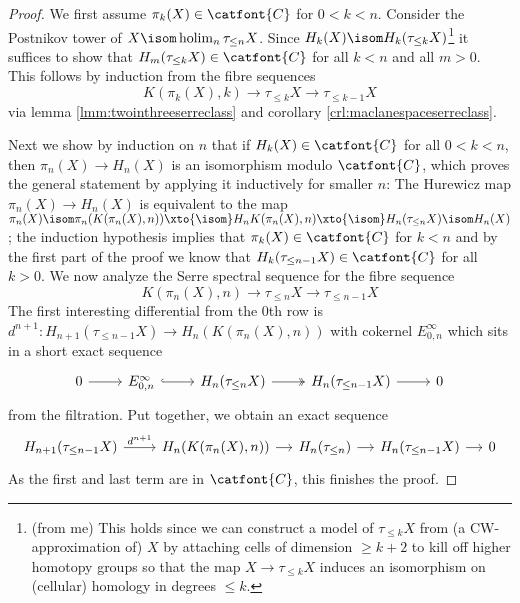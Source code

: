 \begin{proof}
	We first assume $\pi_k(X) \in \catfont{C}$ for $0 < k < n$.
	Consider the Postnikov tower of $X \isom \holim_n \tau_{\leq n} X$.
	Since $H_k(X) \isom H_k(\tau_{\leq k} X)$\footnote{(from me) This holds since we can construct a model of $\tau_{\leq k} X$ from (a CW-approximation of) $X$ by attaching cells of dimension $\geq k + 2$ to kill off higher homotopy groups so that the map $X \to \tau_{\leq k} X$ induces an isomorphism on (cellular) homology in degrees $\leq k$.} it suffices to show that $H_m(\tau_{\leq k} X) \in \catfont{C}$ for all $k < n$ and all $m > 0$.
	This follows by induction from the fibre sequences
	\begin{equation*}
		K(\pi_k(X), k) \to \tau_{\leq k} X \to \tau_{\leq k - 1} X
	\end{equation*}
	via lemma \ref{lmm:twointhreeserreclass} and corollary \ref{crl:maclanespaceserreclass}.

	Next we show by induction on $n$ that if $H_k(X) \in \catfont{C}$ for all $0 < k < n$, then $\pi_n(X) \to H_n(X)$ is an isomorphism modulo $\catfont{C}$, which proves the general statement by applying it inductively for smaller $n$:
	The Hurewicz map $\pi_n(X) \to H_n(X)$ is equivalent to the map $\pi_n(X) \isom \pi_n(K(\pi_n(X), n)) \xto{\isom} H_n K(\pi_n(X), n) \xto{\isom} H_n(\tau_{\leq n} X) \isom H_n(X)$; the induction hypothesis implies that $\pi_k(X) \in \catfont{C}$ for $k < n$ and by the first part of the proof we know that $H_k(\tau_{\leq n - 1} X) \in \catfont{C}$ for all $k > 0$.
	We now analyze the Serre spectral sequence for the fibre sequence
	\begin{equation*}
		K(\pi_n(X), n) \to \tau_{\leq n} X \to \tau_{\leq n - 1} X
	\end{equation*}
	The first interesting differential from the 0th row is $d^{n + 1}\colon H_{n + 1}(\tau_{\leq n - 1} X) \to H_n(K(\pi_n(X), n))$ with cokernel $E^\infty_{0, n}$ which sits in a short exact sequence
	\begin{equation*}
		\begin{tikzcd}
			0
					\ar[r]
				& E^\infty_{0, n}
					\ar[r, hook]
				& H_n(\tau_{\leq n} X)
					\ar[r, two heads]
				& H_n(\tau_{\leq n - 1} X)
					\ar[r]
				& 0
		\end{tikzcd}
	\end{equation*}
	from the filtration.
	Put together, we obtain an exact sequence
	\begin{equation*}
		\begin{tikzcd}[column sep = small]
			H_{n + 1}(\tau_{\leq n - 1} X)
					\ar[r, "d^{n + 1}"]
				&[1.1em] H_n(K(\pi_n(X), n))
					\ar[r]
				& H_n(\tau_{\leq n})
					\ar[r]
				& H_n(\tau_{\leq n - 1} X) 
					\ar[r]
				& 0
		\end{tikzcd}
	\end{equation*}
	As the first and last term are in $\catfont{C}$, this finishes the proof.
\end{proof}
